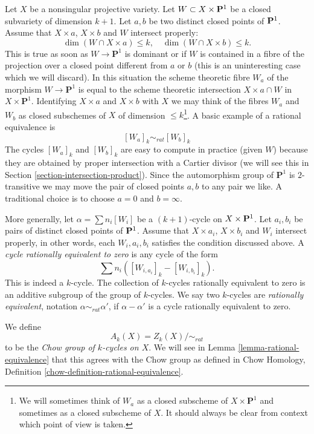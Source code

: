 \medskip\noindent
Let $X$ be a nonsingular projective variety. Let $W \subset X \times {\bf P}^1$
be a closed subvariety of dimension $k + 1$. Let $a, b$ be two distinct closed
points of ${\bf P}^1$. Assume that $X \times a$, $X \times b$ and $W$
intersect properly:
$$
\dim (W \cap X \times a) \leq k,\quad
\dim (W \cap X \times b) \leq k.
$$
This is true as soon as $W \to \mathbf{P}^1$ is dominant or if $W$ is
contained in a fibre of the projection over a closed point different from
$a$ or $b$ (this is an uninteresting case which we will discard). In this
situation the scheme theoretic fibre $W_a$ of the morphism
$W \to \mathbf{P}^1$ is equal to the scheme theoretic intersection
$X \times a \cap W$ in $X \times \mathbf{P}^1$. Identifying $X \times a$
and $X \times b$ with $X$ we may think of the fibres $W_a$ and $W_b$
as closed subschemes of $X$ of dimension $\leq k$\footnote{We will sometimes
think of $W_a$ as a closed subscheme of $X \times \mathbf{P}^1$ and sometimes
as a closed subscheme of $X$. It should always be clear from context which
point of view is taken.}. A basic example of a
rational equivalence is
$$
[W_a]_k \sim_{rat} [W_b]_k
$$
The cycles $[W_a]_k$ and $[W_b]_k$ are easy to compute in practice
(given $W$) because they are obtained by proper intersection with
a Cartier divisor (we will see this in
Section \ref{section-intersection-product}).
Since the automorphism group of $\mathbf{P}^1$ is $2$-transitive we may
move the pair of closed points $a, b$ to any pair we like. A traditional
choice is to choose $a = 0$ and $b = \infty$.

\medskip\noindent
More generally, let $\alpha = \sum n_i [W_i]$ be a $(k + 1)$-cycle on
$X \times {\bf P}^1$.  Let $a_i, b_i$ be pairs of distinct closed points of
${\bf P}^1$. Assume that $X \times a_i$, $X \times b_i$ and $W_i$ intersect
properly, in other words, each $W_i, a_i, b_i$ satisfies the condition
discussed above. A {\it cycle rationally equivalent to zero} is any cycle
of the form
$$
\sum n_i([W_{i, a_i}]_k - [W_{i, b_i}]_k).
$$
This is indeed a $k$-cycle. The collection of $k$-cycles rationally
equivalent to zero is an additive subgroup of the group of $k$-cycles.
We say two $k$-cycles are {\it rationally equivalent}, notation
$\alpha \sim_{rat} \alpha'$, if $\alpha - \alpha'$ is a cycle rationally
equivalent to zero.

\medskip\noindent
We define
$$
A_k(X) = Z_k(X)/ \sim_{rat}
$$
to be the {\it Chow group of $k$-cycles on $X$}. We will see in
Lemma \ref{lemma-rational-equivalence}
that this agrees with the Chow group as defined in
Chow Homology, Definition \ref{chow-definition-rational-equivalence}.


